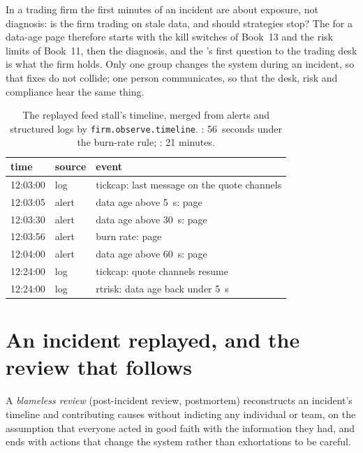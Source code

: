 In a trading firm the first minutes of an incident are about exposure, not diagnosis: is the firm trading on stale data, and should
strategies stop? The  for a data-age page therefore starts with the kill switches of Book~13 and the risk limits of Book~11, then the
diagnosis, and the 's first question to the trading desk is what the firm holds. Only one group changes the system during an
incident, so that fixes do not collide; one person communicates, so that the desk, risk and compliance hear the same thing.

\begin{table}[htbp]
\centering\small
\begin{tabular}{lll}
\toprule
time & source & event\\
\midrule
12:03:00 & log & tickcap: last message on the quote channels\\
12:03:05 & alert & data age above 5~s: page\\
12:03:30 & alert & data age above 30~s: page\\
12:03:56 & alert & burn rate: page\\
12:04:00 & alert & data age above 60~s: page\\
12:24:00 & log & tickcap: quote channels resume\\
12:24:00 & log & rtrisk: data age back under 5~s\\
\bottomrule
\end{tabular}
\caption{The replayed feed stall's timeline, merged from alerts and structured logs by \texttt{firm.observe.timeline}. :
56~seconds under the burn-rate rule; : 21 minutes.}\label{tab:pl:observability-and-incident-response:timeline}
\end{table}

\section{An incident replayed, and the review that follows}

\begin{definition}\label{def:pl:observability-and-incident-response:blameless}
A \emph{blameless review} (post-incident review, postmortem) reconstructs an incident's timeline and contributing
causes without indicting any individual or team, on the assumption that everyone acted in good faith with the information they had, and
ends with actions that change the system rather than exhortations to be careful.
\end{definition}

